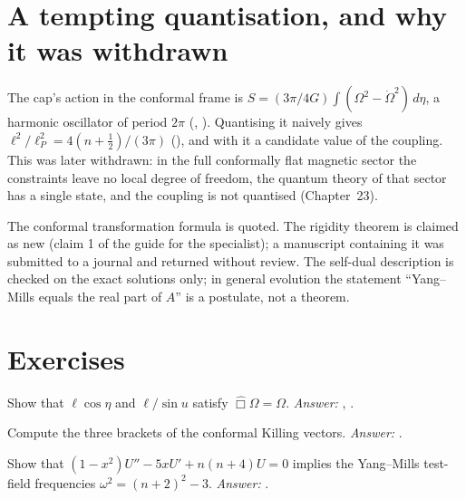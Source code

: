 \section{A tempting quantisation, and why it was withdrawn}

The cap's action in the conformal frame is $S=(3\pi/4G)\int(\Omega^2-\dot\Omega^2)\,d\eta$, a harmonic oscillator of period $2\pi$ (, ). Quantising it naively gives $\ell^2/\ell_P^2=4(n+\tfrac12)/(3\pi)$ (), and with it a candidate value of the coupling. This was later withdrawn: in the full conformally flat magnetic sector the constraints leave no local degree of freedom, the quantum theory of that sector has a single state, and the coupling is not quantised (Chapter~23). \negative

\begin{standsbox}
The conformal transformation formula is quoted. The rigidity theorem is claimed as new (claim 1 of the guide for the specialist); a manuscript containing it was submitted to a journal and returned without review. The self-dual description is checked on the exact solutions only; in general evolution the statement ``Yang--Mills equals the real part of $A$'' is a postulate, not a theorem.
\end{standsbox}

\section*{Exercises}
\begin{exercise}Show that $\ell\cos\eta$ and $\ell/\sin u$ satisfy $\hat\Box\Omega=\Omega$. \emph{Answer:} , .\end{exercise}
\begin{exercise}Compute the three brackets of the conformal Killing vectors. \emph{Answer:} .\end{exercise}
\begin{exercise}Show that $(1-x^2)U''-5xU'+n(n+4)U=0$ implies the Yang--Mills test-field frequencies $\omega^2=(n+2)^2-3$. \emph{Answer:} .\end{exercise}
